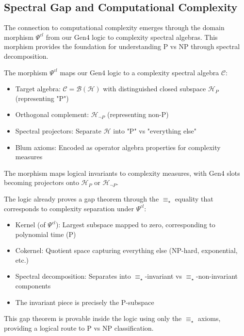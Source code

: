 \subsection{Spectral Gap and Computational Complexity}

The connection to computational complexity emerges through the domain morphism $\Psi^{cl}$ from our Gen4 logic to complexity spectral algebras. This morphism provides the foundation for understanding P vs NP through spectral decomposition.

\begin{definition}
\label{def:complexity-spectral-morphism}
The morphism $\Psi^{cl}$ maps our Gen4 logic to a complexity spectral algebra $\mathscr{C}$:
\begin{itemize}
\item Target algebra: $\mathscr{C} = \mathcal{B}(\mathcal{H})$ with distinguished closed subspace $\mathcal{H}_P$ (representing "P")
\item Orthogonal complement: $\mathcal{H}_{\neg P}$ (representing non-P)
\item Spectral projectors: Separate $\mathcal{H}$ into "P" vs "everything else"
\item Blum axioms: Encoded as operator algebra properties for complexity measures
\end{itemize}
The morphism maps logical invariants to complexity measures, with Gen4 slots becoming projectors onto $\mathcal{H}_P$ or $\mathcal{H}_{\neg P}$.
\end{definition}

\begin{theorem}
\label{thm:gap-theorem-logic}
The logic already proves a gap theorem through the $\equiv_\star$ equality that corresponds to complexity separation under $\Psi^{cl}$:
\begin{itemize}
\item Kernel (of $\Psi^{cl}$): Largest subspace mapped to zero, corresponding to polynomial time (P)
\item Cokernel: Quotient space capturing everything else (NP-hard, exponential, etc.)
\item Spectral decomposition: Separates into $\equiv_\star$-invariant vs $\equiv_\star$-non-invariant components
\item The invariant piece is precisely the P-subspace
\end{itemize}
This gap theorem is provable inside the logic using only the $\equiv_\star$ axioms, providing a logical route to P vs NP classification.
\end{theorem}

